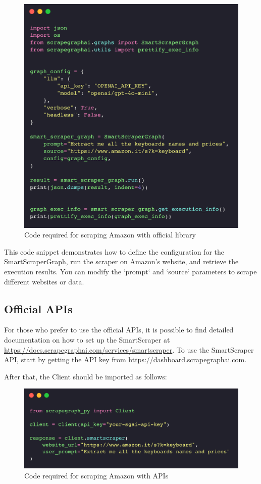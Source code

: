 \begin{figure}[h!]
    \centering
    \includegraphics[width=0.95\linewidth]{Assets/library.png}
    \caption{Code required for scraping Amazon with official library}
    \label{fig:enter-label}
\end{figure}

This code snippet demonstrates how to define the configuration for the SmartScraperGraph, run the scraper on Amazon's website, and retrieve the execution results. You can modify the `prompt` and `source` parameters to scrape different websites or data.

\subsection{Official APIs}

For those who prefer to use the official APIs, it is possible to find detailed documentation on how to set up the SmartScraper at \url{https://docs.scrapegraphai.com/services/smartscraper}. 
To use the SmartScraper API, start by getting the API key from \url{https://dashboard.scrapegraphai.com}.

After that, the Client should be imported as follows:

\begin{figure}[h!]
    \centering
    \includegraphics[width=0.95\linewidth]{Assets/api.png}
    \caption{Code required for scraping Amazon with APIs}
    \label{fig:enter-label}
\end{figure}

